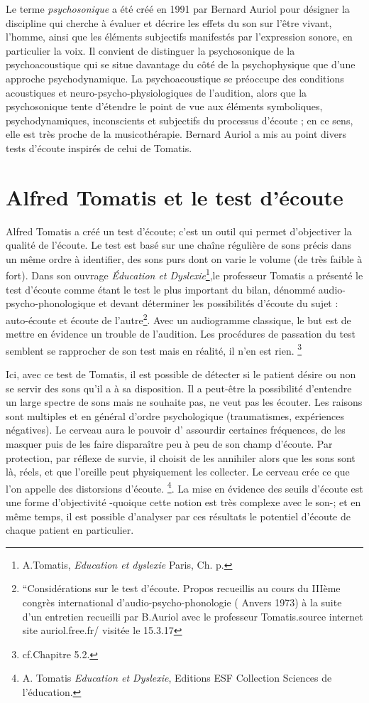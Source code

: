 Le terme \emph{psychosonique} a été créé en 1991 par Bernard Auriol pour
désigner la discipline qui cherche à évaluer et décrire les effets du
son sur l'être vivant, l'homme, ainsi que les éléments
subjectifs manifestés par l'expression sonore, en particulier la voix.
Il convient de distinguer la psychosonique de la psychoacoustique qui
se situe davantage du côté de la psychophysique que d'une approche
psychodynamique. La psychoacoustique se préoccupe des conditions
acoustiques et neuro-psycho-physiologiques de l'audition, alors que la
psychosonique tente d'étendre le point de vue aux éléments
symboliques, psychodynamiques, inconscients et subjectifs du processus
d'écoute ;  en ce sens, elle est très proche de la musicothérapie.
Bernard Auriol a mis au point divers tests d'écoute inspirés de celui de Tomatis.
  
\section{Alfred Tomatis et le test d'écoute}
  Alfred Tomatis a créé un test d'écoute; c'est un outil qui permet d'objectiver la qualité de l'écoute.
  Le test est  basé sur une chaîne régulière de sons précis dans un même ordre à identifier, des sons purs dont on varie le volume (de très faible à fort). Dans son ouvrage \emph{Éducation et Dyslexie}\footnote{A.Tomatis, \textit{Education et dyslexie} Paris, Ch.  p.  },le professeur Tomatis
  a présenté le test d'écoute comme étant le test le plus important du
  bilan, dénommé audio-psycho-phonologique et devant déterminer les
  possibilités d'écoute du sujet : auto-écoute et écoute de
  l'autre\footnote{``Considérations sur le test d'écoute. Propos
  	recueillis au cours du IIIème congrès international
  	d'audio-psycho-phonologie ( Anvers 1973) à la suite d'un entretien recueilli par B.Auriol
  	avec le professeur Tomatis.source internet site auriol.free.fr/ visitée le  15.3.17}. 
  Avec un audiogramme classique, le but est de mettre en évidence un trouble de l'audition. Les procédures de passation du test semblent se rapprocher de son test mais en réalité, il n'en est rien. \footnote{ cf.Chapitre 5.2.}
  
  Ici, avec ce test de Tomatis, il est possible de détecter si le patient désire ou non se servir des sons
  qu'il a à sa disposition. Il a peut-être la possibilité d'entendre un large spectre de
  sons mais ne souhaite pas, ne veut pas les écouter. Les raisons sont multiples et en général d'ordre psychologique (traumatismes,
  expériences négatives). Le cerveau aura le
  pouvoir d' assourdir certaines fréquences, de les masquer puis de les faire disparaître peu à peu de
  son champ d'écoute. Par protection, par réflexe de survie, il choisit de les
  annihiler alors que les sons sont là, réels, et que  l'oreille peut physiquement les collecter. Le cerveau crée ce
  que l'on appelle des distorsions d'écoute. \footnote{A.
    Tomatis \emph{Education et Dyslexie},  Editions ESF
    Collection Sciences de l'éducation.}. %
La mise en évidence des seuils d'écoute est une forme d'objectivité -quoique cette notion est très complexe avec le son-; et en même temps,  il est possible d'analyser par ces résultats le potentiel d'écoute de chaque patient en particulier.


